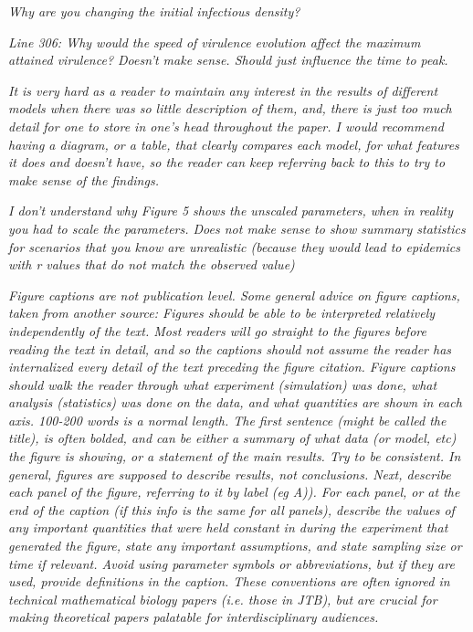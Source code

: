 \documentclass[10pt]{letter}
\newcommand{\revcomment}[1]{\emph{#1}}
\begin{document}
\begin{letter}{
}
\revcomment{
Why are you changing the initial infectious density?
}

\revcomment{
Line 306: Why would the speed of virulence evolution affect the maximum attained virulence? Doesn’t make sense. Should just influence the time to peak.
}

\revcomment{
It is very hard as a reader to maintain any interest in the results of different models when there was so little description of them, and, there is just too much detail for one to store in one’s head throughout the paper. I would recommend having a diagram, or a table, that clearly compares each model, for what features it does and doesn’t have, so the reader can keep referring back to this to try to make sense of the findings.
}

\revcomment{
I don’t understand why Figure 5 shows the unscaled parameters, when in reality you had to scale the parameters. Does not make sense to show summary statistics for scenarios that you know are unrealistic (because they would lead to epidemics with r values that do not match the observed value)
}

\revcomment{
Figure captions are not publication level. Some general advice on figure captions, taken from another source: Figures should be able to be interpreted relatively independently of the text. Most readers will go straight to the figures before reading the text in detail, and so the captions should not assume the reader has internalized every detail of the text preceding the figure citation. Figure captions should walk the reader through what experiment (simulation) was done, what analysis (statistics) was done on the data, and what quantities are shown in each axis. 100-200 words is a normal length. The first sentence (might be called the title), is often bolded, and can be either a summary of what data (or model, etc) the figure is showing, or a statement of the main results. Try to be consistent. In general, figures are supposed to describe results, not conclusions. Next, describe each panel of the figure, referring to it by label (eg A)). For each panel, or at the end of the caption (if this info is the same for all panels), describe the values of any important quantities that were held constant in during the experiment that generated the figure, state any important assumptions, and state sampling size or time if relevant. Avoid using parameter symbols or abbreviations, but if they are used, provide definitions in the caption. These conventions are often ignored in technical mathematical biology papers (i.e. those in JTB), but are crucial for making theoretical papers palatable for interdisciplinary audiences.
}


\end{letter}
\end{document}
